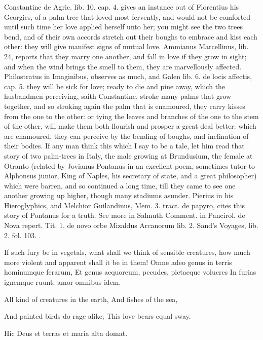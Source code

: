Constantine de Agric. lib. 10. cap. 4. gives an instance out of
Florentius his Georgics, of a palm-tree that loved most fervently,
 and would not be comforted until such time her love applied
herself unto her; you might see the two trees bend, and of their own
accords stretch out their boughs to embrace and kiss each other: they
will give manifest signs of mutual love. Ammianus Marcellinus, lib. 24,
reports that they marry one another, and fall in love if they grow in
sight; and when the wind brings the smell to them, they are
marvellously affected. Philostratus in Imaginibus, observes as much,
and Galen lib. 6. de locis affectis, cap. 5. they will be sick for
love; ready to die and pine away, which the husbandmen perceiving,
saith Constantine, stroke many palms that grow together, and so
stroking again the palm that is enamoured, they carry kisses from the
one to the other: or tying the leaves and branches of the one to the
stem of the other, will make them both flourish and prosper a great
deal better: which are enamoured, they can perceive by the
bending of boughs, and inclination of their bodies. If any man think
this which I say to be a tale, let him read that story of two
palm-trees in Italy, the male growing at Brundusium, the female at
Otranto (related by Jovianus Pontanus in an excellent poem, sometimes
tutor to Alphonsus junior, King of Naples, his secretary of state, and
a great philosopher) which were barren, and so continued a long time,
till they came to see one another growing up higher, though many
stadiums asunder. Pierius in his Hieroglyphics, and Melchior
Guilandinus, Mem. 3. tract. de papyro, cites this story of Pontanus for
a truth. See more in Salmuth Comment. in Pancirol. de Nova repert. Tit.
1. de novo orbe Mizaldus Arcanorum lib. 2. Sand's Voyages, lib. 2. fol.
103. \etc{}.

If such fury be in vegetals, what shall we think of sensible creatures,
how much more violent and apparent shall it be in them!
Omne adeo genus in terris hominumque ferarum,
Et genus aequoreum, pecudes, pictaeque volucres
In furias ignemque ruunt; amor omnibus idem.


All kind of creatures in the earth,
And fishes of the sea,

And painted birds do rage alike;
This love bears equal sway.


Hic Deus et terras et maria alta domat.

